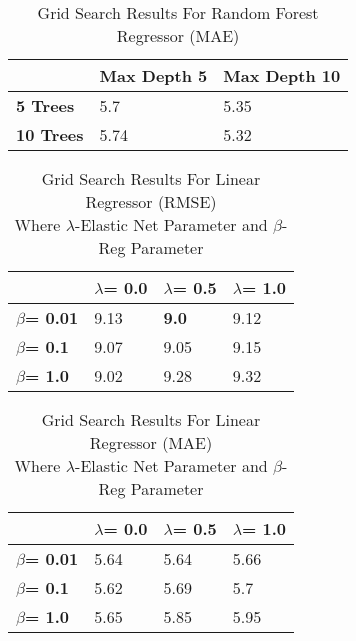 \begin{table}[ht!]
  \small
  \centering
  \caption{Grid Search Results For Random Forest Regressor (MAE)}\label{tab:grid_search_rf_mae}
  \begin{tabular}{lll}
    \toprule
                      & \textbf{Max Depth 5} & \textbf{Max Depth 10} \\
    \midrule
    \textbf{5 Trees}  & 5.7                  & 5.35                  \\
    \textbf{10 Trees} & 5.74                 & 5.32                  \\
    \bottomrule
  \end{tabular}
\end{table}

\begin{table}[ht!]
  \small
  \centering
  \caption{Grid Search Results For Linear Regressor (RMSE)\\ Where $\lambda$-Elastic Net Parameter and $\beta$-Reg Parameter }\label{tab:grid_search_lr_rmse}
  \begin{tabular}{llll}
    \toprule
                           & \textbf{$\lambda$= 0.0} & \textbf{$\lambda$=  0.5} & \textbf{$\lambda$=  1.0} \\
    \midrule
    \textbf{$\beta$= 0.01} & 9.13                    & \textbf{9.0}             & 9.12                     \\
    \textbf{$\beta$= 0.1}  & 9.07                    & 9.05                     & 9.15                     \\
    \textbf{$\beta$= 1.0}  & 9.02                    & 9.28                     & 9.32                     \\
    \bottomrule
  \end{tabular}
\end{table}

\begin{table}[ht!]
  \small
  \centering
  \caption{Grid Search Results For Linear Regressor (MAE)\\ Where $\lambda$-Elastic Net Parameter and $\beta$-Reg Parameter}\label{tab:grid_search_lr_mae}
  \begin{tabular}{llll}
    \toprule
                           & \textbf{$\lambda$= 0.0} & \textbf{$\lambda$=  0.5} & \textbf{$\lambda$=  1.0} \\
    \midrule
    \textbf{$\beta$= 0.01} & 5.64                    & 5.64                     & 5.66                     \\
    \textbf{$\beta$= 0.1}  & 5.62                    & 5.69                     & 5.7                      \\
    \textbf{$\beta$= 1.0}  & 5.65                    & 5.85                     & 5.95                     \\
    \bottomrule
  \end{tabular}
\end{table}

